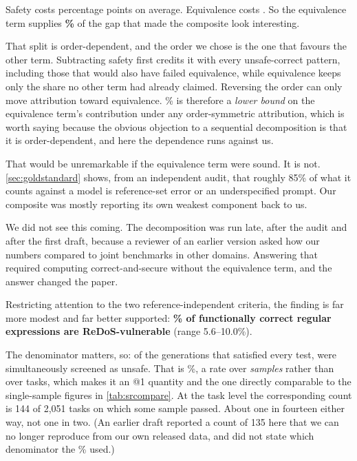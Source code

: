 \documentclass[11pt]{article}
\begin{document}
Safety costs \safetyloss{} percentage points on average. Equivalence costs
\equivloss{}. So the equivalence term supplies \textbf{\equivshare{}\%} of the
gap that made the composite look interesting.

That split is order-dependent, and the order we chose is the one that favours
the other term. Subtracting safety first credits it with every unsafe-correct
pattern, including those that would also have failed equivalence, while
equivalence keeps only the share no other term had already claimed. Reversing
the order can only move attribution toward equivalence. \equivshare{}\% is
therefore a \emph{lower bound} on the equivalence term's contribution under
any order-symmetric attribution, which is worth saying because the obvious
objection to a sequential decomposition is that it is order-dependent, and
here the dependence runs against us.

That would be unremarkable if the equivalence term were sound. It is not.
\cref{sec:goldstandard} shows, from an independent audit, that roughly 85\% of
what it counts against a model is reference-set error or an underspecified
prompt. Our composite was mostly reporting its own weakest component back to
us.

We did not see this coming. The decomposition was run late, after the audit
and after the first draft, because a reviewer of an earlier version asked how
our numbers compared to joint benchmarks in other domains. Answering that
required computing correct-and-secure without the equivalence term, and the
answer changed the paper.

Restricting attention to the two reference-independent criteria, the finding
is far more modest and far better supported: \textbf{\vulngivencorrect{}\% of functionally
correct regular expressions are ReDoS-vulnerable} (range 5.6--10.0\%).

The denominator matters, so: of the \correctsamples{} generations that
satisfied every test, \correctvulnsamples{} were simultaneously screened as
unsafe. That is \vulngivencorrect{}\%, a rate over \emph{samples} rather than
over tasks, which makes it an @1 quantity and the one directly comparable to
the single-sample figures in \cref{tab:srcompare}. At the task level the
corresponding count is 144 of 2{,}051 tasks on which some sample passed. About
one in fourteen either way, not one in two. (An earlier draft reported a count
of 135 here that we can no longer reproduce from our own released data, and
did not state which denominator the \vulngivencorrect{}\% used.)
\end{document}
